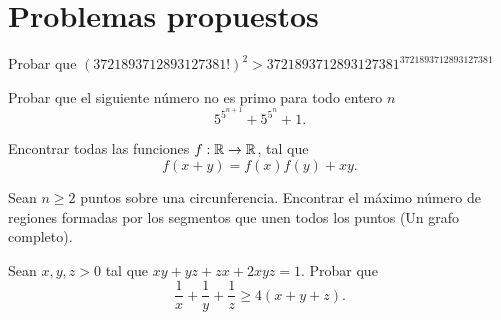 \section*{\large Problemas propuestos}

\begin{problem}
    Probar que $(3721893712893127381!)^2 > 3721893712893127381^{3721893712893127381}$
\end{problem}

\begin{problem}
Probar que el siguiente número no es primo para todo entero $n$ $$5^{5^{n+1}} + 5^{5^n} + 1.$$
\end{problem}

\begin{problem}
    Encontrar todas las funciones $f:\mathbb{R} \rightarrow \mathbb{R}$, tal que $$f(x+y)=f(x)f(y)+xy.$$
\end{problem}

\begin{problem}
    Sean $n\geq2$ puntos sobre una circunferencia. Encontrar el máximo número de regiones
    formadas por los segmentos que unen todos los puntos (Un grafo completo).
\end{problem}

\begin{problem}
    Sean $x,y,z > 0$ tal que $xy+yz+zx+2xyz=1$. Probar que $$\frac{1}{x} + \frac{1}{y} + \frac{1}{z} \geq 4(x+y+z).$$
\end{problem}